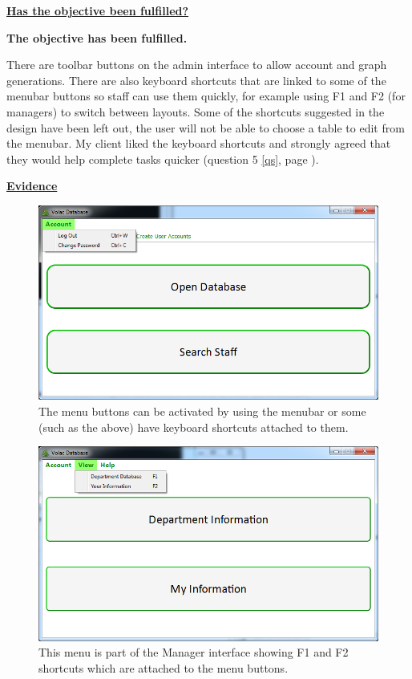 \underline{\textbf{Has the objective been fulfilled?}}

\textbf{The objective has been fulfilled.}

There are toolbar buttons on the admin interface to allow account and graph generations. There are also keyboard shortcuts that are linked to some of the menubar buttons so staff can use them quickly, for example using F1 and F2 (for managers) to switch between layouts. Some of the shortcuts suggested in the design have been left out, the user will not be able to choose a table to edit from the menubar. My client liked the keyboard shortcuts and strongly agreed that they would help complete tasks quicker (question 5 \ref{qs}, page \pageref{qs}).

\underline{\textbf{Evidence}}

\begin{figure}[H]
    \includegraphics[width=\textwidth]{./Evaluation/Images/shortcuts1.png}
    \caption{The menu buttons can be activated by using the menubar or some (such as the above) have keyboard shortcuts attached to them.} 
\end{figure}

\begin{figure}[H]
    \includegraphics[width=\textwidth]{./Evaluation/Images/shortcuts2.png}
    \caption{This menu is part of the Manager interface showing F1 and F2 shortcuts which are attached to the menu buttons.} 
\end{figure}


